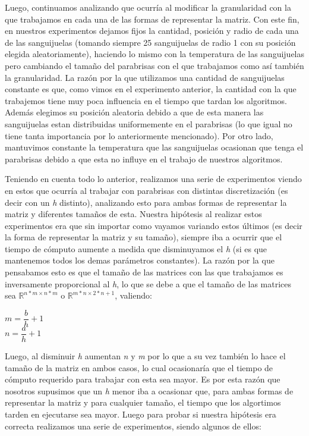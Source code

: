 \documentclass[10pt, a4paper]{article}
\begin{document}
Luego, continuamos analizando que ocurr\'ia al modificar la granularidad con la que trabajamos en cada una de las formas de representar la matriz. Con este fin, en nuestros experimentos dejamos fijos la cantidad, posici\'on y radio de cada una de las sanguijuelas (tomando siempre 25 sanguijuelas de radio 1 con su posici\'on elegida aleatoriamente), haciendo lo mismo con la temperatura de las sanguijuelas pero cambiando el tamaño del parabrisas con el que trabajamos como as\'i tambi\'en la granularidad. La raz\'on por la que utilizamos una cantidad de sanguijuelas constante es que, como vimos en el experimento anterior, la cantidad con la que trabajemos tiene muy poca influencia en el tiempo que tardan los algoritmos. Adem\'as elegimos su posici\'on aleatoria debido a que de esta manera las sanguijuelas estan distribuidas uniformemente en el parabrisas (lo que igual no tiene tanta importancia por lo anteriormente mencionado). Por otro lado, mantuvimos constante la temperatura que las sanguijuelas ocasionan que tenga el parabrisas debido a que esta no influye en el trabajo de nuestros algoritmos.

Teniendo en cuenta todo lo anterior, realizamos una serie de experimentos viendo en estos que ocurr\'ia al trabajar con parabrisas con distintas discretizaci\'on (es decir con un \textit{h} distinto), analizando esto para ambas formas de representar la matriz y diferentes tamaños de esta. Nuestra hip\'otesis al realizar estos experimentos era que sin importar como vayamos variando estos \'ultimos (es decir la forma de representar la matriz y su tamaño), siempre iba a ocurrir que el tiempo de c\'omputo aumente a medida que disminuyamos el \textit{h} (si es que mantenemos todos los demas par\'ametros constantes). La raz\'on por la que pensabamos esto es que el tamaño de las matrices con las que trabajamos es inversamente proporcional al \textit{h}, lo que se debe a que el tamaño de las matrices sea $\mathbb{R}^{n*m \times n*m}$ o $\mathbb{R}^{m*n \times 2*n+1}$, valiendo:

\begin{center}
$m = \dfrac{b}{h}+1$ \\
$n = \dfrac{a}{h}+1$
\end{center}

Luego, al disminuir \textit{h} aumentan \textit{n} y \textit{m} por lo que a su vez tambi\'en lo hace el tamaño de la matriz en ambos casos, lo cual ocasionar\'ia que el tiempo de c\'omputo requerido para trabajar con esta sea mayor. Es por esta raz\'on que nosotros supusimos que un \textit{h} menor iba a ocasionar que, para ambas formas de representar la matriz y para cualquier tamaño, el tiempo que los algortimos tarden en ejecutarse sea mayor. Luego para probar si nuestra hip\'otesis era correcta realizamos una serie de experimentos, siendo algunos de ellos:
\end{document}

